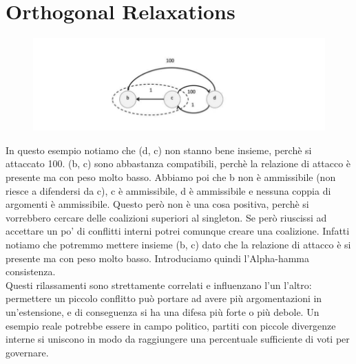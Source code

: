 \section{Orthogonal Relaxations}
\begin{figure}[htp]
	\centering
    \includegraphics[width=12cm, keepaspectratio]{img/Cap6/ortogonal.png}
\end{figure}
\noindent In questo esempio notiamo che (d, c) non stanno bene insieme, perchè si attaccato 100. (b, c) sono abbastanza compatibili, perchè la relazione di attacco è presente ma con peso molto basso. Abbiamo poi che b non è ammissibile (non riesce a difendersi da c), c è ammissibile, d è ammissibile e nessuna
coppia di argomenti è ammissibile. Questo però non è una cosa positiva, perchè si vorrebbero cercare delle coalizioni superiori al singleton. Se però riuscissi ad accettare un po’ di conflitti interni potrei comunque creare una coalizione. Infatti notiamo che potremmo mettere insieme (b, c) dato che
la relazione di attacco è si presente ma con peso molto basso. Introduciamo quindi l’Alpha-hamma consistenza.\\
Questi rilassamenti sono strettamente correlati
e influenzano l’un l’altro: permettere un piccolo conflitto può portare ad avere più
argomentazioni in un’estensione, e di conseguenza si ha una difesa più forte o più debole.
Un esempio reale potrebbe essere in campo politico, partiti con piccole divergenze
interne si uniscono in modo da raggiungere una percentuale sufficiente di voti per
governare.

